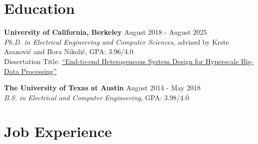 \documentclass[line]{res}
\begin{document}
\address{\href{https://abejgonzalez.github.io}{https://abejgonzalez.github.io} $|$ \href{mailto:abegonzalez@google.com}{abegonzalez@google.com} $|$ \href{https://www.linkedin.com/in/abraham-j-gonzalez/}{linkedin.com/in/abraham-j-gonzalez}}

\begin{resume}

\vspace{-6mm}

\section{\Large{Education}}
\label{sec:education}
\vspace{2mm}

\textbf{University of California, Berkeley} \hfill August 2018 - August 2025
\\
\textit{Ph.D. in Electrical Engineering and Computer Sciences}, advised by Krste Asanovi\'c and Bora Nikoli\'c, GPA: 3.96/4.0
\\
Dissertation Title: \href{https://www2.eecs.berkeley.edu/Pubs/TechRpts/2025/31916.html}{``End-to-end Heterogeneous System Design for Hyperscale Big-Data Processing''}

\vspace{-2mm}

\textbf{The University of Texas at Austin} \hfill August 2014 - May 2018
\\
\textit{B.S. in Electrical and Computer Engineering}, GPA: 3.98/4.0

\section{\Large{Job Experience}}
\label{sec:jobs}
\vspace{2mm}


\end{resume}
\end{document}

